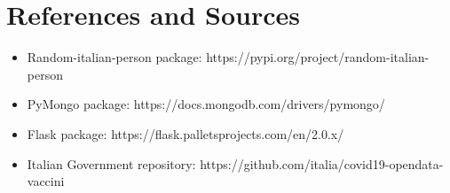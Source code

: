 \documentclass{article}
\begin{document}
\section{References and Sources}
\begin{itemize}
    \item Random-italian-person package: https://pypi.org/project/random-italian-person
    \item PyMongo package: https://docs.mongodb.com/drivers/pymongo/
    \item Flask package: https://flask.palletsprojects.com/en/2.0.x/
    \item Italian Government repository: https://github.com/italia/covid19-opendata-vaccini
\end{itemize}
\end{document}
